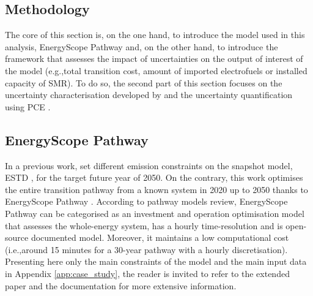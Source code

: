 \documentclass[11pt,twoside,a4paper,english]{article}
\def\eg{e.g.,}
\def\ie{i.e.,}
\begin{document}
\begin{appendices}

\section{Methodology}
\label{sec:methodo}
The core of this section is, on the one hand, to introduce the model used in this analysis, EnergyScope Pathway \cite{limpens2024pathway} and, on the other hand, to introduce the framework that assesses the impact of uncertainties on the output of interest of the model (\eg total transition cost, amount of imported electrofuels or installed capacity of \gls{SMR}). To do so, the second part of this section focuses on the uncertainty characterisation developed by \citet{Moret2017} and the uncertainty quantification using \acrfull{PCE} \cite{Sudret2014}.

\subsection{EnergyScope Pathway}
\label{subsec:meth:ES_Pathway}
In a previous work, \citet{rixhon2021role} set different emission constraints on the snapshot model, \gls{ESTD} \cite{limpens2019energyscope}, for the target future year of 2050. On the contrary, this work optimises the entire transition pathway from a known system in 2020 up to 2050 thanks to EnergyScope Pathway \cite{limpens2024pathway}. According to pathway models review, EnergyScope Pathway can be categorised as an investment and operation optimisation model that assesses the whole-energy system, has a hourly time-resolution and is open-source documented model. Moreover, it maintains a low computational cost (\ie around 15 minutes for a 30-year pathway with a hourly discretisation). Presenting here only the main constraints of the model and the main input data in Appendix \ref{app:case_study}, the reader is invited to refer to the extended paper \cite{limpens2024pathway} and the documentation \cite{readthedocs_pathway} for more extensive information.


\end{appendices}
\end{document}
